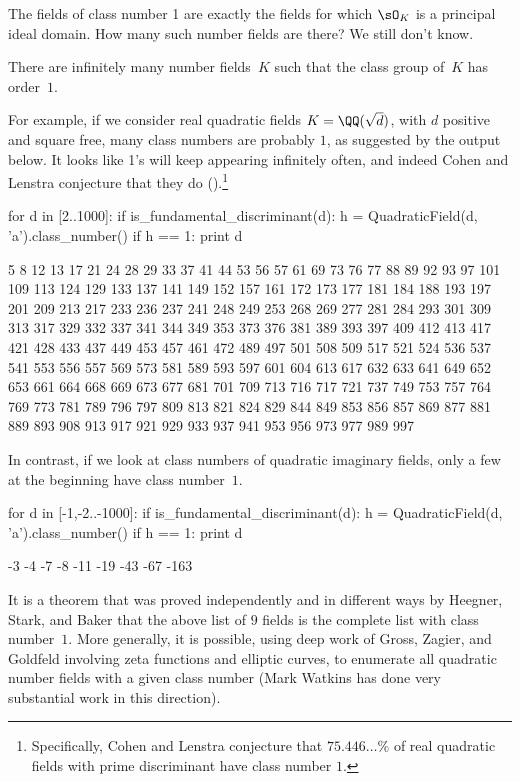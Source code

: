 The fields of class number 1 are exactly the fields for
which $\sO_K$ is a principal ideal domain.  How many such
number fields are there?   We still don't know.
\begin{conjecture}
	There are infinitely many number fields~$K$ such that the class
	group of~$K$ has order~$1$.
\end{conjecture}
For example, if we consider real quadratic fields $K=\QQ(\sqrt{d})$,
with $d$ positive and square free, many class numbers are probably $1$,
as suggested by the {\Sage} output below.
It looks like 1's will keep appearing infinitely often, and indeed
Cohen and Lenstra conjecture that they do
(\cite{cohen-lenstra:heuristics}).\footnote{Specifically, Cohen and
	Lenstra conjecture that $75.446\dots\%$ of real quadratic fields
	with prime discriminant have class number $1$.}
\begin{sagecode}
	\begin{sagecell}
		for d in [2..1000]:
		if is_fundamental_discriminant(d):
		h = QuadraticField(d, 'a').class_number()
		if h == 1:
		print d
	\end{sagecell}
	\begin{sageout}
		5 8 12 13 17 21 24 28 29 33 37 41 44 53 56 57 61 69
		73 76 77 88 89 92 93 97 101 109 113 124 129 133 137
		141 149 152 157 161 172 173 177 181 184 188 193 197
		201 209 213 217 233 236 237 241 248 249 253 268 269
		277 281 284 293 301 309 313 317 329 332 337 341 344
		349 353 373 376 381 389 393 397 409 412 413 417 421
		428 433 437 449 453 457 461 472 489 497 501 508 509
		517 521 524 536 537 541 553 556 557 569 573 581 589
		593 597 601 604 613 617 632 633 641 649 652 653 661
		664 668 669 673 677 681 701 709 713 716 717 721 737
		749 753 757 764 769 773 781 789 796 797 809 813 821
		824 829 844 849 853 856 857 869 877 881 889 893 908
		913 917 921 929 933 937 941 953 956 973 977 989 997
	\end{sageout}
\end{sagecode}
In contrast, if we look at class numbers of quadratic imaginary fields,
only a few at the beginning have class number~$1$.
\begin{sagecode}
	\begin{sagecell}
		for d in [-1,-2..-1000]:
		if is_fundamental_discriminant(d):
		h = QuadraticField(d, 'a').class_number()
		if h == 1:
		print d
	\end{sagecell}
	\begin{sageout}
		-3 -4 -7 -8 -11 -19 -43 -67 -163
	\end{sageout}
\end{sagecode}
It is a theorem that was proved independently and in different ways by
Heegner, Stark, and Baker that the above list of $9$ fields is the
complete list with class number~$1$.  More generally, it is possible,
using deep work of Gross, Zagier, and Goldfeld involving zeta
functions and elliptic curves, to enumerate all quadratic number
fields with a given class number (Mark Watkins has done very
substantial work in this direction).

